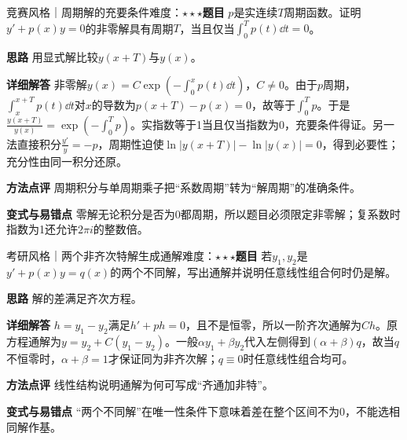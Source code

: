 \begin{example}{竞赛风格｜周期解的充要条件}{难度：$\star\star\star$}\label{deep:ex:ode_source_deep:periodicA}\textbf{题目} $p$是实连续$T$周期函数。证明$y'+p(x)y=0$的非零解具有周期$T$，当且仅当$\int_0^Tp(t)\dd t=0$。\par\textbf{思路} 用显式解比较$y(x+T)$与$y(x)$。\par\textbf{详细解答} 非零解$y(x)=C\exp(-\int_0^xp(t)\dd t)$，$C\ne0$。由于$p$周期，$\int_x^{x+T}p(t)\dd t$对$x$的导数为$p(x+T)-p(x)=0$，故等于$\int_0^Tp$。于是$\frac{y(x+T)}{y(x)}=\exp(-\int_0^Tp)$。实指数等于1当且仅当指数为0，充要条件得证。另一法直接积分$\frac{y'}{y}=-p$，周期性迫使$\ln|y(x+T)|-\ln|y(x)|=0$，得到必要性；充分性由同一积分还原。\par\textbf{方法点评} 周期积分与单周期乘子把“系数周期”转为“解周期”的准确条件。\par\textbf{变式与易错点} 零解无论积分是否为0都周期，所以题目必须限定非零解；复系数时指数为1还允许$2\pi i$的整数倍。\end{example}

\begin{example}{考研风格｜两个非齐次特解生成通解}{难度：$\star\star\star$}\label{deep:ex:ode_source_deep:twosolutions}\textbf{题目} 若$y_1,y_2$是$y'+p(x)y=q(x)$的两个不同解，写出通解并说明任意线性组合何时仍是解。\par\textbf{思路} 解的差满足齐次方程。\par\textbf{详细解答} $h=y_1-y_2$满足$h'+ph=0$，且不是恒零，所以一阶齐次通解为$Ch$。原方程通解为$y=y_2+C(y_1-y_2)$。一般$\alpha y_1+\beta y_2$代入左侧得到$(\alpha+\beta)q$，故当$q$不恒零时，$\alpha+\beta=1$才保证同为非齐次解；$q\equiv0$时任意线性组合均可。\par\textbf{方法点评} 线性结构说明通解为何可写成“齐通加非特”。\par\textbf{变式与易错点} “两个不同解”在唯一性条件下意味着差在整个区间不为0，不能选相同解作基。\end{example}
